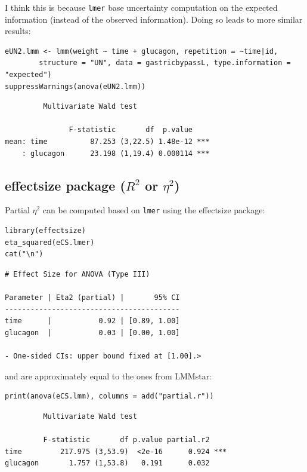 \documentclass[12pt]{article}
\begin{document}
I think this is because \texttt{lmer} base uncertainty computation on the
expected information (instead of the observed information). Doing so
leads to more similar results:
\lstset{language=r,label= ,caption= ,captionpos=b,numbers=none}
\begin{lstlisting}
eUN2.lmm <- lmm(weight ~ time + glucagon, repetition = ~time|id,
		structure = "UN", data = gastricbypassL, type.information = "expected")
suppressWarnings(anova(eUN2.lmm))
\end{lstlisting}

\begin{verbatim}
	     Multivariate Wald test 

               F-statistic       df  p.value    
mean: time          87.253 (3,22.5) 1.48e-12 ***
    : glucagon      23.198 (1,19.4) 0.000114 ***
\end{verbatim}

\subsection{effectsize package (\(R^2\) or \(\eta^2\))}
\label{sec:org12e4373}

Partial \(\eta^2\) can be computed based on \texttt{lmer} using the effectsize package:
\lstset{language=r,label= ,caption= ,captionpos=b,numbers=none}
\begin{lstlisting}
library(effectsize)
eta_squared(eCS.lmer)
cat("\n")
\end{lstlisting}

\begin{verbatim}
# Effect Size for ANOVA (Type III)

Parameter | Eta2 (partial) |       95% CI
-----------------------------------------
time      |           0.92 | [0.89, 1.00]
glucagon  |           0.03 | [0.00, 1.00]

- One-sided CIs: upper bound fixed at [1.00].>
\end{verbatim}


and are approximately equal to the ones from LMMstar:
\lstset{language=r,label= ,caption= ,captionpos=b,numbers=none}
\begin{lstlisting}
print(anova(eCS.lmm), columns = add("partial.r"))
\end{lstlisting}

\begin{verbatim}
	     Multivariate Wald test 

         F-statistic       df p.value partial.r2    
time         217.975 (3,53.9)  <2e-16      0.924 ***
glucagon       1.757 (1,53.8)   0.191      0.032
\end{verbatim}
\end{document}
